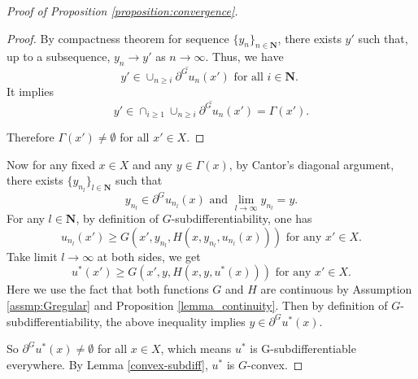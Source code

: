 \documentclass[a4paper, 11pt]{amsart}
\numberwithin{equation}{section}
\theoremstyle{plain}
\theoremstyle{definition}
\theoremstyle{remark}
\newcommand{\N}{\mathbf{N}}
\begin{document}
\begin{proof}[Proof of Proposition \ref{proposition:convergence}]
\begin{proof}
	By compactness theorem for sequence $\{y_n\}_{n\in \N}$,  there exists $y'$ such that, up to a subsequence, $y_n \rightarrow y'$ as $n \rightarrow \infty$. Thus, we have 
	$$y' \in \overline{\cup_{n\ge i}\partial^G u_n(x')} \text{ for all $i\in \N$. }$$
	It implies $$y' \in \cap_{i\ge 1} \overline{\cup_{n\ge i}\partial^G u_n(x')} = \Gamma (x').$$ 
	
	Therefore $\Gamma(x') \neq \emptyset$ for all $x' \in X$.\medskip
\end{proof}	
	
	
	
	
	Now for any fixed $x\in X$ and any $y\in \Gamma(x)$, by Cantor's diagonal argument, there exists $\{y_{n_l}\}_{l\in \N}$ such that $$y_{n_l} \in \partial^G u_{n_l}(x) \text{ and } \lim\limits_{l\rightarrow \infty} y_{n_l} = y.$$
	For any $l\in \N$, by definition of $G$-subdifferentiability, one has
	$$u_{n_l}(x')\ge G(x', y_{n_l}, H(x, y_{n_l}, u_{n_l}(x))) \text{	for any $x' \in X$.}$$
	Take limit $l \rightarrow \infty$ at both sides, we get 
	$$u^*(x') \ge G(x', y, H(x, y, u^*(x))) \text{	for any $x'\in X$.}$$ 
	Here we use the fact that both functions $G$ and
		$H$ are continuous by Assumption \ref{assmp:Gregular} and Proposition \ref{lemma_continuity}.
Then by definition of $G$-subdifferentiability, the above inequality implies $y\in \partial ^G u^*(x)$. 

	So $\partial^G u^*(x)\neq \emptyset$ for all $x\in X$, which means $u^*$ is G-subdifferentiable everywhere. By Lemma \ref{convex-subdiff}, $u^*$ is $G$-convex.
\end{proof}

\vspace{0.3cm}
\end{document}
